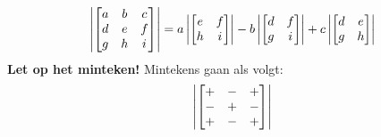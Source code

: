 \[
    \det{
    a & b & c \\
    d & e & f \\
    g & h & i \\
    }
    = a \det{e & f \\ h & i} - b \det{d & f \\ g & i} + c \det{d & e \\ g & h}
\]
\textbf{Let op het minteken!} Mintekens gaan als volgt:
\[
    \det{
    + & - & + \\
    - & + & - \\
    + & - & +
    }
\]